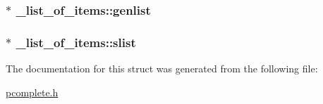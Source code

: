\subsubsection[{\texorpdfstring{genlist}{genlist}}]{$\ast$ \+\_\+list\+\_\+of\+\_\+items\+::genlist}\hypertarget{struct__list__of__items_a8e0d2617812516da3f9dfcc76f5642ea}{}\label{struct__list__of__items_a8e0d2617812516da3f9dfcc76f5642ea}
\subsubsection[{\texorpdfstring{slist}{slist}}]{$\ast$ \+\_\+list\+\_\+of\+\_\+items\+::slist}\hypertarget{struct__list__of__items_a97a05d10fc76fd2802524c017f6f83b6}{}\label{struct__list__of__items_a97a05d10fc76fd2802524c017f6f83b6}


The documentation for this struct was generated from the following file\+:\begin{DoxyCompactItemize}
\item 
\hyperlink{pcomplete_8h}{pcomplete.\+h}\end{DoxyCompactItemize}

